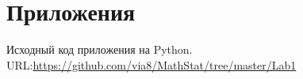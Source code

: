 \documentclass[12pt,a4paper]{article}
\begin{document}
	\section{Приложения}
	\noindent [1] Исходный код приложения на Python.\\ URL:{\url{https://github.com/via8/MathStat/tree/master/Lab1}}
\end{document}

